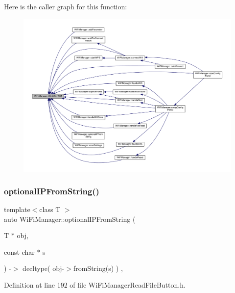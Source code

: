 Here is the caller graph for this function\+:\nopagebreak
\begin{figure}[H]
\begin{center}
\leavevmode
\includegraphics[width=350pt]{d4/dc8/class_wi_fi_manager_ae5f595c670ccbcf9a191baf50f5c7c26_icgraph}
\end{center}
\end{figure}
\mbox{\label{class_wi_fi_manager_a6a94f08eb43e0871932556a4ccfa11b7}} 
\subsubsection{\texorpdfstring{optional\+I\+P\+From\+String()}{optionalIPFromString()}\hspace{0.1cm}{\footnotesize\ttfamily [1/2]}}
{\footnotesize\ttfamily template$<$class T $>$ \\
auto Wi\+Fi\+Manager\+::optional\+I\+P\+From\+String (\begin{DoxyParamCaption}\item[{T $\ast$}]{obj,  }\item[{const char $\ast$}]{s }\end{DoxyParamCaption}) -\/$>$ decltype(  obj-\/$>$from\+String(s)  ) \hspace{0.3cm}{\ttfamily [inline]}, {\ttfamily [private]}}



Definition at line 192 of file Wi\+Fi\+Manager\+Read\+File\+Button.\+h.



